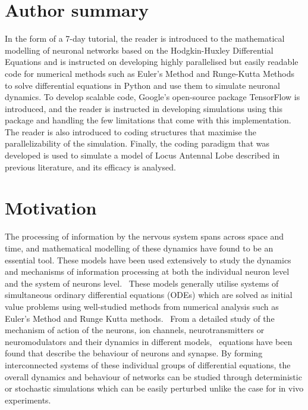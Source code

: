 \documentclass[10pt,letterpaper]{article}
\begin{document}
\section*{Author summary}
In the form of a 7-day tutorial, the reader is introduced to the mathematical modelling of neuronal networks based on the Hodgkin-Huxley Differential Equations and is instructed on developing highly parallelised but easily readable code for numerical methods such as Euler's Method and Runge-Kutta Methods to solve differential equations in Python and use them to simulate neuronal dynamics. To develop scalable code, Google's open-source package TensorFlow is introduced, and the reader is instructed in developing simulations using this package and handling the few limitations that come with this implementation. The reader is also introduced to coding structures that maximise the parallelizability of the simulation. Finally, the coding paradigm that was developed is used to simulate a model of Locus Antennal Lobe described in previous literature, and its efficacy is analysed. 

\linenumbers

\section*{Motivation}
The processing of information by the nervous system spans across space and time, and mathematical modelling of these dynamics have found to be an essential tool. These models have been used extensively to study the dynamics and mechanisms of information processing at both the individual neuron level~\cite{} and the system of neurons level.~\cite{} These models generally utilise systems of simultaneous ordinary differential equations (ODEs) which are solved as initial value problems using well-studied methods from numerical analysis such as Euler's Method and Runge Kutta methods.~\cite{} From a detailed study of the mechanism of action of the neurons, ion channels, neurotransmitters or neuromodulators and their dynamics in different models,~\cite{} equations have been found that describe the behaviour of neurons and synapse. By forming interconnected systems of these individual groups of differential equations, the overall dynamics and behaviour of networks can be studied through deterministic or stochastic simulations which can be easily perturbed unlike the case for in vivo experiments.
\end{document}

